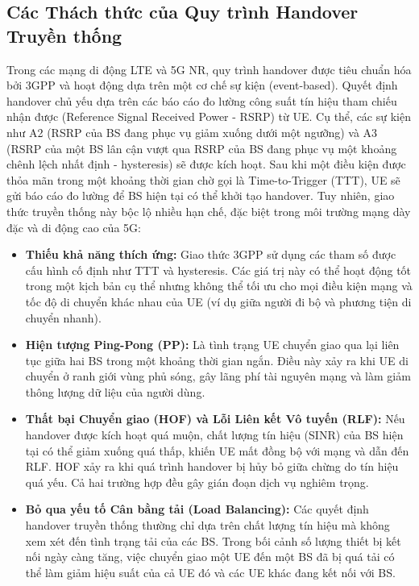 \documentclass{article} %
\begin{document}
\subsection{Các Thách thức của Quy trình Handover Truyền thống}
Trong các mạng di động LTE và 5G NR, quy trình handover được tiêu chuẩn hóa bởi 3GPP và hoạt động dựa trên một cơ chế sự kiện (event-based). Quyết định handover chủ yếu dựa trên các báo cáo đo lường công suất tín hiệu tham chiếu nhận được (Reference Signal Received Power - RSRP) từ UE. Cụ thể, các sự kiện như A2 (RSRP của BS đang phục vụ giảm xuống dưới một ngưỡng) và A3 (RSRP của một BS lân cận vượt qua RSRP của BS đang phục vụ một khoảng chênh lệch nhất định - hysteresis) sẽ được kích hoạt. Sau khi một điều kiện được thỏa mãn trong một khoảng thời gian chờ gọi là Time-to-Trigger (TTT), UE sẽ gửi báo cáo đo lường để BS hiện tại có thể khởi tạo handover.
Tuy nhiên, giao thức truyền thống này bộc lộ nhiều hạn chế, đặc biệt trong môi trường mạng dày đặc và di động cao của 5G:
\begin{itemize}
    \item \textbf{Thiếu khả năng thích ứng:} Giao thức 3GPP sử dụng các tham số được cấu hình cố định như TTT và hysteresis. Các giá trị này có thể hoạt động tốt trong một kịch bản cụ thể nhưng không thể tối ưu cho mọi điều kiện mạng và tốc độ di chuyển khác nhau của UE (ví dụ giữa người đi bộ và phương tiện di chuyển nhanh).
    \item \textbf{Hiện tượng Ping-Pong (PP):} Là tình trạng UE chuyển giao qua lại liên tục giữa hai BS trong một khoảng thời gian ngắn. Điều này xảy ra khi UE di chuyển ở ranh giới vùng phủ sóng, gây lãng phí tài nguyên mạng và làm giảm thông lượng dữ liệu của người dùng.
    \item \textbf{Thất bại Chuyển giao (HOF) và Lỗi Liên kết Vô tuyến (RLF):} Nếu handover được kích hoạt quá muộn, chất lượng tín hiệu (SINR) của BS hiện tại có thể giảm xuống quá thấp, khiến UE mất đồng bộ với mạng và dẫn đến RLF. HOF xảy ra khi quá trình handover bị hủy bỏ giữa chừng do tín hiệu quá yếu. Cả hai trường hợp đều gây gián đoạn dịch vụ nghiêm trọng.
    \item \textbf{Bỏ qua yếu tố Cân bằng tải (Load Balancing):} Các quyết định handover truyền thống thường chỉ dựa trên chất lượng tín hiệu mà không xem xét đến tình trạng tải của các BS. Trong bối cảnh số lượng thiết bị kết nối ngày càng tăng, việc chuyển giao một UE đến một BS đã bị quá tải có thể làm giảm hiệu suất của cả UE đó và các UE khác đang kết nối với BS.
\end{itemize}
\end{document}
